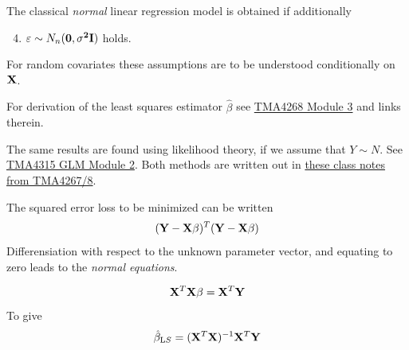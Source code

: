 \documentclass[
  ignorenonframetext,
]{beamer}
\providecommand{\tightlist}{%
  \setlength{\itemsep}{0pt}\setlength{\parskip}{0pt}}
\begin{document}
\begin{frame}

The classical \emph{normal} linear regression model is obtained if
additionally

\begin{enumerate}
\setcounter{enumi}{3}
\tightlist
\item
  \(\varepsilon\sim N_n(\bf{0},\sigma^2\bf{I})\) holds.
\end{enumerate}

For random covariates these assumptions are to be understood
conditionally on \(\bf{X}\).

For derivation of the least squares estimator \(\hat{\beta}\) see
\href{https://www.math.ntnu.no/emner/TMA4268/2019v/3LinReg/3LinReg.html\#parameter_estimation}{TMA4268
Module 3} and links therein.

The same results are found using likelihood theory, if we assume that
\(Y\sim N\). See
\href{https://www.math.ntnu.no/emner/TMA4315/2018h/2MLR.html\#likelihood_theory_(from_b4)}{TMA4315
GLM Module 2}. Both methods are written out in
\href{https://www.math.ntnu.no/emner/TMA4268/2018v/notes/LeastSquaresMLR.pdf}{these
class notes from TMA4267/8}.

\end{frame}

\begin{frame}

The squared error loss to be minimized can be written
\[({\bf Y}-{\bf X}{{\beta}})^T({\bf Y}-{\bf X}{{\beta}})\]
Differensiation with respect to the unknown parameter vector, and
equating to zero leads to the \emph{normal equations}.

\[ {\bf X}^T{\bf X}{\beta}= {\bf X}^T {\bf Y}\] To give
\[ \hat{\beta}_{\text LS}=({\bf X}^T{\bf X})^{-1} {\bf X}^T {\bf Y}\]

\end{frame}
\end{document}
